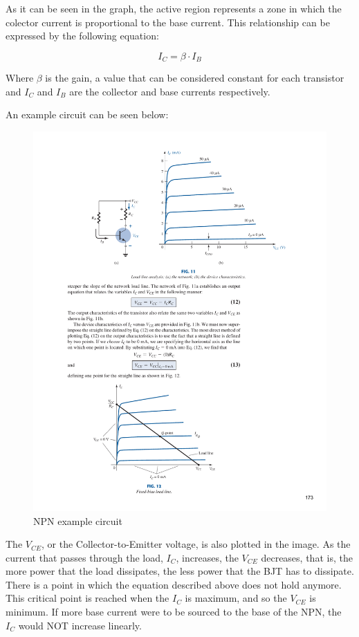 As it can be seen in the graph, the active region represents a zone in which the colector current is proportional to the base current. This relationship can be expressed by the following equation:

\begin{equation*}
    I_C = \beta \cdot I_B
\end{equation*}

\noindent Where $\beta$ is the gain, a value that can be considered constant for each transistor and $I_C$ and $I_B$ are the collector and base currents respectively. \medskip

An example circuit can be seen below:

\begin{figure}[H]
    \centering
    \includegraphics[scale = 1]{Graphics/Practice 8/BJT/NPN_CIRCUIT.pdf}
    \caption{NPN example circuit~\autocite{BOYLESTAD}}
    \label{fig:NPN_EXAMPLE}
\end{figure}

The $V_{CE}$, or the Collector-to-Emitter voltage, is also plotted in the image. As the current that passes through the load, $I_C$, increases, the $V_{CE}$ decreases, that is, the more power that the load dissipates, the less power that the BJT has to dissipate. There is a point in which the equation described above does not hold anymore. This critical point is reached when the $I_C$ is maximum, and so the $V_{CE}$ is minimum. If more base current were to be sourced to the base of the NPN, the $I_C$ would NOT increase linearly.\medskip


